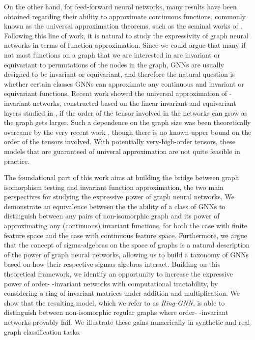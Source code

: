 \documentclass{article}
\begin{document}
On the other hand, for feed-forward neural networks, many results have been obtained regarding their ability to approximate continuous functions, commonly known as the universal approximation theorems, such as the seminal works of \cite{cybenko1989approximation, hornik1991hornik}. Following this line of work, it is natural to study the expressivity of graph neural networks in terms of function approximation. Since we could argue that many if not most functions on a graph that we are interested in are invariant or equivariant to permutations of the nodes in the graph, GNNs are usually designed to be invariant or equivariant, and therefore the natural question is whether certain classes GNNs can approximate any continuous and invariant or equivariant functions. Recent work \cite{maron2019universality} showed the universal approximation of -invariant networks, constructed based on the linear invariant and equivariant layers studied in \cite{maron2018invariant}, if the order of the tensor involved in the networks can grow as the graph gets larger. Such a dependence on the graph size was been theoretically overcame by the very recent work \cite{keriven2019universal}, though there is no known upper bound on the order of the tensors involved. 
With potentially very-high-order tensors, these models that are guaranteed of univeral approximation are not quite feasible in practice.  


The foundational part of this work aims at building the bridge between graph isomorphism testing and invariant function approximation, the two main  perspectives for studying the expressive power of graph neural networks. We demonstrate an equivalence between the the ability of a class of GNNs to distinguish between any pairs of non-isomorphic graph and its power of approximating any (continuous) invariant functions, for both the case with finite feature space and the case with continuous feature space. Furthermore, we argue that the concept of sigma-algebras on the space of graphs is a natural description of the power of graph neural networks, allowing us to build a taxonomy of GNNs based on how their respective sigmas-algebras interact. Building on this theoretical framework, we identify an opportunity to increase the expressive power of order- -invariant networks with computational tractability, by considering a ring of invariant matrices under addition and multiplication. We show that the resulting model, which we refer to as \emph{Ring-GNN}, is able to distinguish between non-isomorphic regular graphs where order- -invariant networks provably fail. We illustrate these gains numerically in synthetic and real graph classification tasks. 
\end{document}
